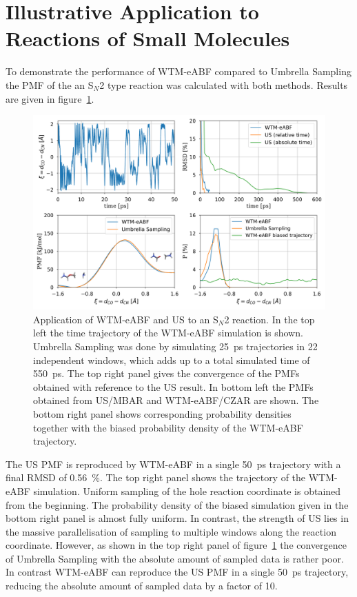 \section{Illustrative Application to Reactions of Small Molecules}
\label{sec:Sn2}
To demonstrate the performance of WTM-eABF compared to Umbrella Sampling
the PMF of the an S$_N$2 type reaction was calculated with both methods.
Results are given in figure~\ref{fig:Sn2}.
\begin{figure}[H]
  \centering
    \includegraphics[width=0.999\textwidth]{bilder/sirt5_SW}
  \caption{
    Application of WTM-eABF and US to an S$_N$2 reaction. In the top left the time trajectory of the WTM-eABF simulation is shown. Umbrella Sampling was done by simulating 25~ps trajectories in 22 independent windows, which adds up to a total simulated time of 550~ps. The top right panel gives the convergence of the PMFs obtained with reference to the US result. In bottom left the PMFs obtained from US/MBAR and WTM-eABF/CZAR are shown. The bottom right panel shows corresponding probability densities together with the biased probability density of the WTM-eABF trajectory.
  }
  \label{fig:Sn2}
\end{figure}
The US PMF is reproduced by WTM-eABF in a single 50~ps trajectory with a final RMSD of 0.56~\%.
The top right panel shows the trajectory of the WTM-eABF simulation.
Uniform sampling of the hole reaction coordinate is obtained from the beginning.
The probability density of the biased simulation given in the bottom right panel is almost fully uniform.
In contrast, the strength of US lies in the massive parallelisation of sampling to multiple windows along the reaction coordinate.
However, as shown in the top right panel of figure~\ref{fig:Sn2} the convergence of Umbrella Sampling with the absolute amount of sampled data is rather poor.
In contrast WTM-eABF can reproduce the US PMF in a single 50~ps trajectory, reducing the absolute amount of sampled data by a factor of 10.


